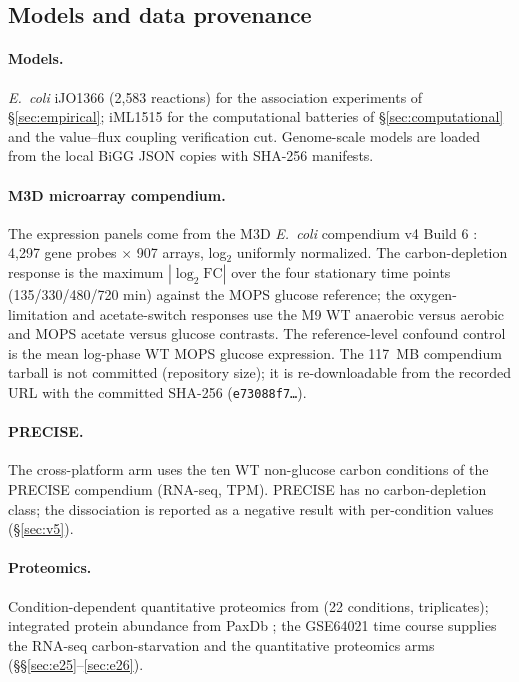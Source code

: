 \documentclass[11pt,a4paper]{article}
\theoremstyle{plain}
\theoremstyle{definition}
\theoremstyle{remark}
\begin{document}
\subsection{Models and data provenance}\label{sec:data}

\paragraph{Models.} \emph{E.~coli} iJO1366 (2{,}583 reactions) \citep{orth2011} for the association experiments of \S\ref{sec:empirical}; iML1515 \citep{monk2017} for the computational batteries of \S\ref{sec:computational} and the value--flux coupling verification cut. Genome-scale models are
loaded from the local BiGG JSON copies with SHA-256 manifests.

\paragraph{M3D microarray compendium.} The expression panels come from
the M3D \emph{E.~coli} compendium v4 Build 6
\citep{faith2008, faith2007}: 4{,}297 gene probes $\times$ 907
arrays, log$_2$ uniformly normalized. The carbon-depletion response
is the maximum $|\log_2\mathrm{FC}|$ over the four stationary
time points (135/330/480/720 min) against the MOPS glucose
reference; the oxygen-limitation and acetate-switch responses use
the M9 WT anaerobic versus aerobic and MOPS acetate versus glucose
contrasts. The reference-level confound control is the mean
log-phase WT MOPS glucose expression. The 117~MB compendium
tarball is not committed (repository size); it is re-downloadable
from the recorded URL with the committed SHA-256
(\texttt{e73088f7\allowbreak\ldots}).

\paragraph{PRECISE.} The cross-platform arm uses the ten WT
non-glucose carbon conditions of the PRECISE compendium
\citep{sastry2019} (RNA-seq, TPM). PRECISE has no carbon-depletion class; the dissociation is reported as a negative result with per-condition values (\S\ref{sec:v5}).

\paragraph{Proteomics.} Condition-dependent quantitative proteomics
from \citet{schmidt2016} (22 conditions, triplicates); integrated
protein abundance from PaxDb \citep{wang2015}; the GSE64021
\citep{barrett2013} time course supplies the RNA-seq
carbon-starvation and the quantitative proteomics arms (\S\S\ref{sec:e25}--\ref{sec:e26}).
\end{document}
